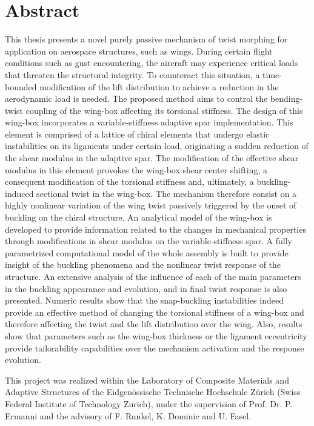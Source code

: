 \section*{Abstract}

This thesis presents a novel purely passive mechanism of twist morphing for application on aerospace structures, such as wings. During certain flight conditions such as gust encountering, the aircraft may experience critical loads that threaten the structural integrity. To counteract this situation, a time-bounded modification of the lift distribution to achieve a reduction in the aerodynamic load is needed. The proposed method aims to control the bending-twist coupling of the wing-box affecting its torsional stiffness. The design of this wing-box incorporates a variable-stiffness adaptive spar implementation. This element is comprised of a lattice of chiral elements that undergo elastic instabilities on its ligaments under certain load, originating a sudden reduction of the shear modulus in the adaptive spar. The modification of the effective shear modulus in this element provokes the wing-box shear center shifting, a consequent modification of the torsional stiffness and, ultimately, a buckling-induced sectional twist in the wing-box. The mechanism therefore consist on a highly nonlinear variation of the wing twist passively triggered by the onset of buckling on the chiral structure. An analytical model of the wing-box is developed to provide information related to the changes in mechanical properties through modifications in shear modulus on the variable-stiffness spar. A fully parametrized computational model of the whole assembly is built to provide insight of the buckling phenomena and the nonlinear twist response of the structure. An extensive analysis of the influence of each of the main parameters in the buckling appearance and evolution, and in final twist response is also presented. Numeric results show that the snap-buckling instabilities indeed provide an effective method of changing the torsional stiffness of a wing-box and therefore affecting the twist and the lift distribution over the wing. Also, results show that parameters such as the wing-box thickness or the ligament eccentricity provide tailorability capabilities over the mechanism activation and the response evolution.

%

\vfill
\normalsize
\noindent
This project was realized within the Laboratory of Composite Materials and Adaptive Structures of the Eidgen\"ossische Technische Hochschule Z\"urich (Swiss Federal Institute of Technology Zurich), under the supervision of Prof. Dr. P. Ermanni and the advisory of F. Runkel, K. Dominic and U. Fasel.